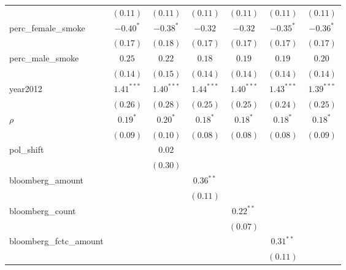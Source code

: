 \begin{table}[!h]
\begin{center}
\begin{tabular}{l c c c c c c }
                        & $(0.11)$     & $(0.11)$     & $(0.11)$     & $(0.11)$     & $(0.11)$     & $(0.11)$     \\
perc\_female\_smoke     & $-0.40^{*}$  & $-0.38^{*}$  & $-0.32$      & $-0.32$      & $-0.35^{*}$  & $-0.36^{*}$  \\
                        & $(0.17)$     & $(0.18)$     & $(0.17)$     & $(0.17)$     & $(0.17)$     & $(0.17)$     \\
perc\_male\_smoke       & $0.25$       & $0.22$       & $0.18$       & $0.19$       & $0.19$       & $0.20$       \\
                        & $(0.14)$     & $(0.15)$     & $(0.14)$     & $(0.14)$     & $(0.14)$     & $(0.14)$     \\
year2012                & $1.41^{***}$ & $1.40^{***}$ & $1.44^{***}$ & $1.40^{***}$ & $1.43^{***}$ & $1.39^{***}$ \\
                        & $(0.26)$     & $(0.28)$     & $(0.25)$     & $(0.25)$     & $(0.24)$     & $(0.25)$     \\
$\rho$                  & $0.19^{*}$   & $0.20^{*}$   & $0.18^{*}$   & $0.18^{*}$   & $0.18^{*}$   & $0.18^{*}$   \\
                        & $(0.09)$     & $(0.10)$     & $(0.08)$     & $(0.08)$     & $(0.08)$     & $(0.09)$     \\
pol\_shift              &              & $0.02$       &              &              &              &              \\
                        &              & $(0.30)$     &              &              &              &              \\
bloomberg\_amount       &              &              & $0.36^{**}$  &              &              &              \\
                        &              &              & $(0.11)$     &              &              &              \\
bloomberg\_count        &              &              &              & $0.22^{**}$  &              &              \\
                        &              &              &              & $(0.07)$     &              &              \\
bloomberg\_fctc\_amount &              &              &              &              & $0.31^{**}$  &              \\
                        &              &              &              &              & $(0.11)$     &              \\

\end{tabular}
\end{center}
\end{table}
